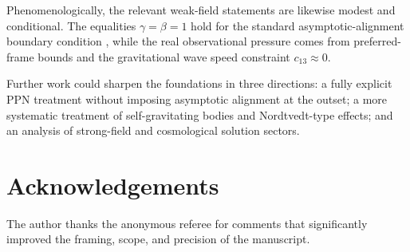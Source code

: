 \documentclass[12pt,a4paper]{article}
\begin{document}
        Phenomenologically, the relevant weak-field statements are likewise modest and
        conditional. The equalities $\gamma=\beta=1$ hold for the standard
        asymptotic-alignment boundary condition \citep{foster2006}, while the real
        observational pressure comes from preferred-frame bounds and the gravitational
        wave speed constraint $c_{13}\approx 0$.
        
        Further work could sharpen the foundations in three directions: a fully explicit
        PPN treatment without imposing asymptotic alignment at the outset; a more
        systematic treatment of self-gravitating bodies and Nordtvedt-type effects; and
        an analysis of strong-field and cosmological solution sectors.
    
    \section*{Acknowledgements}
        The author thanks the anonymous referee for comments that significantly improved
        the framing, scope, and precision of the manuscript.
        
\end{document}
